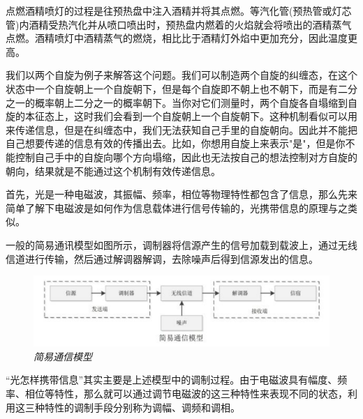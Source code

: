\begin{multicols}{2}
点燃酒精喷灯的过程是往预热盘中注入酒精并将其点燃。等汽化管(预热管或灯芯管)内酒精受热汽化并从喷口喷出时，预热盘内燃着的火焰就会将喷出的酒精蒸气点燃。酒精喷灯中酒精蒸气的燃烧，相比比于酒精灯外焰中更加充分，因此温度更高。

\noindent{}

\noindent{} 我们以两个自旋为例子来解答这个问题。我们可以制造两个自旋的纠缠态，在这个状态中一个自旋朝上一个自旋朝下，但是每个自旋即不朝上也不朝下，而是有二分之一的概率朝上二分之一的概率朝下。当你对它们测量时，两个自旋各自塌缩到自旋的本征态上，这时我们会看到一个自旋朝上一个自旋朝下。这种机制看似可以用来传递信息，但是在纠缠态中，我们无法获知自己手里的自旋朝向。因此并不能把自己想要传递的信息有效的传播出去。比如，你想用自旋上来表示"是"，但是你不能控制自己手中的自旋向哪个方向塌缩，因此也无法按自己的想法控制对方自旋的朝向，结果就是不能通过这个机制有效传递信息。

\noindent{}

\noindent{} 首先，光是一种电磁波，其振幅、频率，相位等物理特性都包含了信息，那么先来简单了解下电磁波是如何作为信息载体进行信号传输的，光携带信息的原理与之类似。

一般的简易通讯模型如图所示，调制器将信源产生的信号加载到载波上，通过无线信道进行传输，然后通过解调器解调，去除噪声后得到信源发出的信息。

\begin{figure}[H]
\centering
\includegraphics[width=\linewidth,clip=true,trim=0 45 0 0]{IMG/201909/190906}
\caption{\textit{简易通信模型}}
\end{figure}

“光怎样携带信息”其实主要是上述模型中的调制过程。由于电磁波具有幅度、频率、相位等特性，那么就可以通过调节电磁波的这三种特性来表现不同的状态，利用这三种特性的调制手段分别称为调幅、调频和调相。


\end{multicols}

